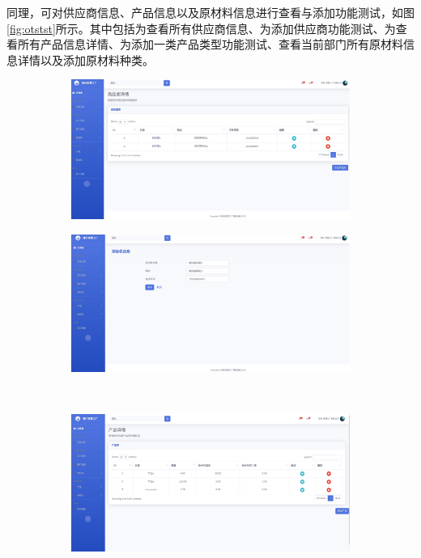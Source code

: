 同理，可对供应商信息、产品信息以及原材料信息进行查看与添加功能测试，如图\ref{fig:otstst}所示。其中包括为查看所有供应商信息、为添加供应商功能测试、为查看所有产品信息详情、为添加一类产品类型功能测试、查看当前部门所有原材料信息详情以及添加原材料种类。

\begin{figure}[H]
    \centering
    \begin{subfigure}{.35\textwidth}
        \centering
        \includegraphics[width=\textwidth]{figures/6viewallsupplier.png}
    \end{subfigure}
    \qquad
    \begin{subfigure}{.35\textwidth}
        \centering
        \includegraphics[width=\textwidth]{figures/6addnewsupplier.png}
    \end{subfigure}
    \\
    \begin{subfigure}{.35\textwidth}
        \centering
        \includegraphics[width=\textwidth]{figures/6viewallproduct.png}

\end{subfigure}
\end{figure}
